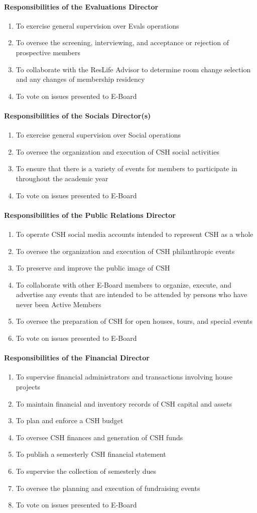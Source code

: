 \documentclass{article}
\newcommand{\asubsubsection}[1]{\paragraph{#1} \label{#1}}
\begin{document}
\asubsubsection{Responsibilities of the Evaluations Director}
\begin{enumerate}
	\item To exercise general supervision over Evals operations
	\item To oversee the screening, interviewing, and acceptance or rejection of prospective members
	\item To collaborate with the ResLife Advisor to determine room change selection and any changes of membership residency
	\item To vote on issues presented to E-Board
\end{enumerate}

\asubsubsection{Responsibilities of the Socials Director(s)}
\begin{enumerate}
	\item To exercise general supervision over Social operations
	\item To oversee the organization and execution of CSH social activities
	\item To ensure that there is a variety of events for members to participate in throughout the academic year
	\item To vote on issues presented to E-Board
\end{enumerate}

\asubsubsection{Responsibilities of the Public Relations Director}
\begin{enumerate}
	\item To operate CSH social media accounts intended to represent CSH as a whole
	\item To oversee the organization and execution of CSH philanthropic events
	\item To preserve and improve the public image of CSH
	\item To collaborate with other E-Board members to organize, execute, and advertise any events that are intended to be attended by persons who have never been Active Members
	\item To oversee the preparation of CSH for open houses, tours, and special events
	\item To vote on issues presented to E-Board
\end{enumerate}

\asubsubsection{Responsibilities of the Financial Director}
\begin{enumerate}
	\item To supervise financial administrators and transactions involving house projects
	\item To maintain financial and inventory records of CSH capital and assets
	\item To plan and enforce a CSH budget
	\item To oversee CSH finances and generation of CSH funds
	\item To publish a semesterly CSH financial statement
	\item To supervise the collection of semesterly dues
	\item To oversee the planning and execution of fundraising events
	\item To vote on issues presented to E-Board
\end{enumerate}
\end{document}
